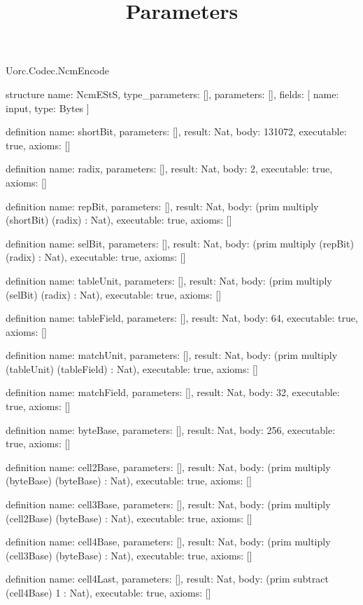 \begin{lexlean}{Uorc.Codec.NcmEncode}
\title{Parameters}
\begin{semanticmodule}
structure{
  name: NcmEStS,
  type_parameters: [],
  parameters: [],
  fields: [
    {name: input, type: Bytes}
  ]
}

definition{
  name: shortBit,
  parameters: [],
  result: Nat,
  body: 131072,
  executable: true,
  axioms: []
}

definition{
  name: radix,
  parameters: [],
  result: Nat,
  body: 2,
  executable: true,
  axioms: []
}

definition{
  name: repBit,
  parameters: [],
  result: Nat,
  body: (prim multiply (shortBit) (radix) : Nat),
  executable: true,
  axioms: []
}

definition{
  name: selBit,
  parameters: [],
  result: Nat,
  body: (prim multiply (repBit) (radix) : Nat),
  executable: true,
  axioms: []
}

definition{
  name: tableUnit,
  parameters: [],
  result: Nat,
  body: (prim multiply (selBit) (radix) : Nat),
  executable: true,
  axioms: []
}

definition{
  name: tableField,
  parameters: [],
  result: Nat,
  body: 64,
  executable: true,
  axioms: []
}

definition{
  name: matchUnit,
  parameters: [],
  result: Nat,
  body: (prim multiply (tableUnit) (tableField) : Nat),
  executable: true,
  axioms: []
}

definition{
  name: matchField,
  parameters: [],
  result: Nat,
  body: 32,
  executable: true,
  axioms: []
}

definition{
  name: byteBase,
  parameters: [],
  result: Nat,
  body: 256,
  executable: true,
  axioms: []
}

definition{
  name: cell2Base,
  parameters: [],
  result: Nat,
  body: (prim multiply (byteBase) (byteBase) : Nat),
  executable: true,
  axioms: []
}

definition{
  name: cell3Base,
  parameters: [],
  result: Nat,
  body: (prim multiply (cell2Base) (byteBase) : Nat),
  executable: true,
  axioms: []
}

definition{
  name: cell4Base,
  parameters: [],
  result: Nat,
  body: (prim multiply (cell3Base) (byteBase) : Nat),
  executable: true,
  axioms: []
}

definition{
  name: cell4Last,
  parameters: [],
  result: Nat,
  body: (prim subtract (cell4Base) 1 : Nat),
  executable: true,
  axioms: []
}


\end{semanticmodule}
\end{lexlean}
